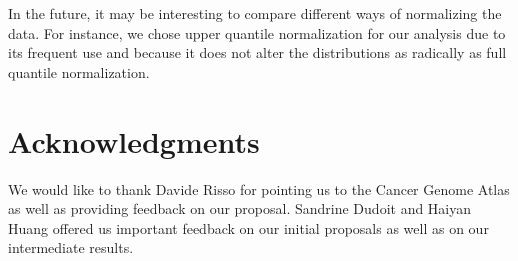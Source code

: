 In the future,  it may be interesting to compare different ways of normalizing
the data. For instance, we chose upper quantile normalization for our analysis
due to its frequent use and because it does not alter the distributions as
radically as full quantile normalization.


\section*{Acknowledgments}

We would like to thank Davide Risso for pointing us to the Cancer Genome Atlas
as well as providing feedback on our proposal. Sandrine Dudoit and Haiyan Huang
offered us important feedback on our initial proposals as well as on our
intermediate results. 




